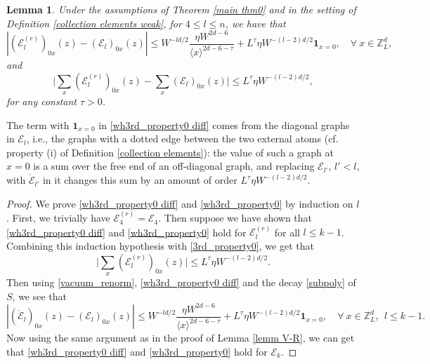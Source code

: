 \documentclass{article}
\newcommand{\1}{\mathds{1}}
\numberwithin{equation}{section}
\newcommand{\be}{\begin{equation}}
\newcommand{\ee}{\end{equation}}
\renewcommand{\leq}{\leqslant}
\renewcommand{\le}{\leq}
\newcommand{\Z}{\mathbb{Z}}
\theoremstyle{plain} %
\newtheorem{lemma}[theorem]{Lemma}
\theoremstyle{remark}
\newcommand{\Sele}{{\mathcal E}}
\newcommand{\Selek}{{\mathcal E}}
\begin{document}
\begin{lemma}
	 Under the assumptions of Theorem \ref{main thm0} and in the setting of Definition \ref{collection elements weak}, for $4\le l \le n$, we have that 
	\be\label{wh3rd_property0 diff}
	\left| ( \Selek_{l}^{(r)})_{0x}(z)-( \Sele_{l})_{0x}(z) \right| \le W^{-ld/2} \frac{\eta W^{2d-6}}{\langle x\rangle^{2d-6-\tau}} + L^\tau\eta W^{-(l-2)d/2}\mathbf 1_{x=0}, \quad \forall \  x\in \Z_L^d ,
	\ee
	and
	\be\label{wh3rd_property0}
	\Big|\sum_{x } (\Selek_{l}^{(r)})_{0x}(z)- \sum_{x } ( \Selek_{l})_{0x}(z)\Big|   \le L^\tau \eta W^{-(l-2)d/2 } ,  
	\ee
	for any constant $\tau>0$.	
\end{lemma}
The term with $\mathbf 1_{x=0}$ in \eqref{wh3rd_property0 diff} comes from the diagonal graphs in $\Sele_l$, i.e., the graphs with a dotted edge between the two external atoms (cf. property (i) of Definition \ref{collection elements}): the value of such a graph at $x=0$ is a sum over the free end of an off-diagonal graph, and replacing $\Sele_{l'}$, $l'<l$, with $\mathring\Sele_{l'}$ in it changes this sum by an amount of order $L^\tau\eta W^{-(l-2)d/2}$.
\begin{proof}	
We prove \eqref{wh3rd_property0 diff} and \eqref{wh3rd_property0} by induction on $l$. First, we trivially have $\Sele_4^{(r)}=\Sele_4$. Then suppose we have shown that \eqref{wh3rd_property0 diff} and \eqref{wh3rd_property0} hold for $\Sele_{l}^{(r)}$ for all $l\le k-1$. Combining this induction hypothesis with \eqref{3rd_property0}, we get that
$$\Big|\sum_{x } (\Selek_{l}^{(r)})_{0x}(z)\Big|   \le L^\tau \eta W^{-(l-2)d/2 } .$$
Then using \eqref{vacuum_renorm}, \eqref{wh3rd_property0 diff} and the decay \eqref{subpoly} of $S$, we see that
$$\left| (\mathring\Selek_{l})_{0x}(z)-( \Sele_{l})_{0x}(z) \right| \le W^{-ld/2} \frac{\eta W^{2d-6}}{\langle x\rangle^{2d-6-\tau}} + L^\tau\eta W^{-(l-2)d/2}\mathbf 1_{x=0}, \quad \forall \  x\in \Z_L^d , \ \ l\le k-1.
$$
Now using the same argument as in the proof of Lemma \ref{lemm V-R},  we can get that \eqref{wh3rd_property0 diff} and \eqref{wh3rd_property0} hold for $\Sele_{k}$. 
\end{proof}
\end{document}
